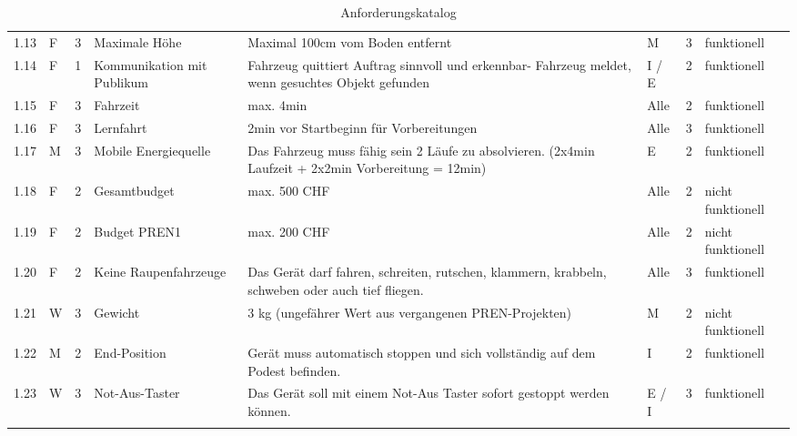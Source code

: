 \begin{longtable}[]{@{}lllp{2cm}p{5cm}llp{2cm}@{}}
1.13 & F & 3 & Maximale Höhe & Maximal 100cm vom Boden entfernt & M & 3
& funktionell\tabularnewline

1.14 & F & 1 & Kommunikation mit Publikum &
Fahrzeug quittiert Auftrag sinnvoll und
erkennbar- Fahrzeug meldet, wenn gesuchtes Objekt
gefunden & I / E & 2 & funktionell\tabularnewline

1.15 & F & 3 & Fahrzeit & max. 4min & Alle & 2 &
funktionell\tabularnewline

1.16 & F & 3 & Lernfahrt & 2min vor Startbeginn für Vorbereitungen &
Alle & 3 & funktionell\tabularnewline

1.17 & M & 3 & Mobile Energiequelle & Das Fahrzeug muss fähig sein 2
Läufe zu absolvieren. (2x4min Laufzeit + 2x2min Vorbereitung = 12min) & E &
2 & funktionell\tabularnewline

1.18 & F & 2 & Gesamtbudget & max. 500 CHF & Alle & 2 & nicht
\hbox{funktionell}\tabularnewline

1.19 & F & 2 & Budget PREN1 & max. 200 CHF & Alle & 2 & nicht
\hbox{funktionell}\tabularnewline

1.20 & F & 2 & Keine Raupenfahrzeuge & Das Gerät darf fahren, schreiten,
rutschen, klammern, krabbeln, schweben oder auch tief fliegen. & Alle &
3 & funktionell\tabularnewline

1.21 & W & 3 & Gewicht & 3 kg (ungefährer Wert aus vergangenen
PREN-Projekten) & M & 2 & nicht \hbox{funktionell}\tabularnewline

1.22 & M & 2 & End-Position & Gerät muss automatisch stoppen und sich
vollständig auf dem Podest befinden. & I & 2 &
funktionell\tabularnewline

1.23 & W & 3 & Not-Aus-Taster & Das Gerät soll mit einem Not-Aus Taster
sofort gestoppt werden können. & E / I & 3 & funktionell\tabularnewline
\caption{Anforderungskatalog}
\label{tab:anforderungsliste}
\end{longtable}
\normalsize